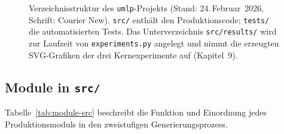 ﻿\documentclass[a4paper,12pt]{report}
\theoremstyle{definition}
\begin{document}
\begin{figure}[H]
{\begin{minipage}{0.86\textwidth}
		\end{minipage}%
	}
	\caption{Verzeichnisstruktur des \texttt{umlp}-Projekts
		(Stand: 24.\,Februar~2026, Schrift: Courier New).
		\texttt{src/} enthält den Produktionscode;
		\texttt{tests/} die automatisierten Tests.
		Das Unterverzeichnis \texttt{src/results/} wird
		zur Laufzeit von \texttt{experiments.py} angelegt
		und nimmt die erzeugten SVG-Grafiken der drei
		Kernexperimente auf (Kapitel~9).}
	\label{fig:projektstruktur}
\end{figure}


\subsection{Module in \texttt{src/}}
\label{subsubsec:module-src}

Tabelle~\ref{tab:module-src} beschreibt die Funktion und
Einordnung jedes Produktionsmoduls in den zweistufigen
Generierungsprozess.
\end{document}
